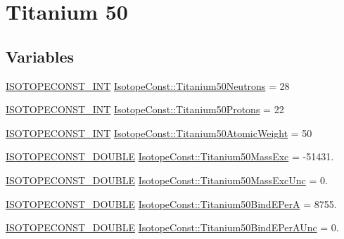 \hypertarget{group___isotope_const-_titanium-_ti50}{}\section{Titanium 50}
\label{group___isotope_const-_titanium-_ti50}
\subsection*{Variables}
\begin{DoxyCompactItemize}
\item 
\mbox{\hyperlink{group___isotope_const-_macros_ga5f18360b3e99483a35c32d789e62621c}{I\+S\+O\+T\+O\+P\+E\+C\+O\+N\+S\+T\+\_\+\+I\+NT}} \mbox{\hyperlink{group___isotope_const-_titanium-_ti50_gaf62e2193f50c55753e1254328da65dd9}{Isotope\+Const\+::\+Titanium50\+Neutrons}} = 28
\item 
\mbox{\hyperlink{group___isotope_const-_macros_ga5f18360b3e99483a35c32d789e62621c}{I\+S\+O\+T\+O\+P\+E\+C\+O\+N\+S\+T\+\_\+\+I\+NT}} \mbox{\hyperlink{group___isotope_const-_titanium-_ti50_ga5084ab4a1070e145d9d53a9663b88e12}{Isotope\+Const\+::\+Titanium50\+Protons}} = 22
\item 
\mbox{\hyperlink{group___isotope_const-_macros_ga5f18360b3e99483a35c32d789e62621c}{I\+S\+O\+T\+O\+P\+E\+C\+O\+N\+S\+T\+\_\+\+I\+NT}} \mbox{\hyperlink{group___isotope_const-_titanium-_ti50_gadd63620f8c7891c59cfa0c38a936ea76}{Isotope\+Const\+::\+Titanium50\+Atomic\+Weight}} = 50
\item 
\mbox{\hyperlink{group___isotope_const-_macros_ga8f45a7272ce02c0b4c65c44636ed719a}{I\+S\+O\+T\+O\+P\+E\+C\+O\+N\+S\+T\+\_\+\+D\+O\+U\+B\+LE}} \mbox{\hyperlink{group___isotope_const-_titanium-_ti50_ga77dd3ad40b842a3dce9cd10012c12e47}{Isotope\+Const\+::\+Titanium50\+Mass\+Exc}} = -\/51431.
\item 
\mbox{\hyperlink{group___isotope_const-_macros_ga8f45a7272ce02c0b4c65c44636ed719a}{I\+S\+O\+T\+O\+P\+E\+C\+O\+N\+S\+T\+\_\+\+D\+O\+U\+B\+LE}} \mbox{\hyperlink{group___isotope_const-_titanium-_ti50_ga963701d96b0242dda1016017ae115ba2}{Isotope\+Const\+::\+Titanium50\+Mass\+Exc\+Unc}} = 0.
\item 
\mbox{\hyperlink{group___isotope_const-_macros_ga8f45a7272ce02c0b4c65c44636ed719a}{I\+S\+O\+T\+O\+P\+E\+C\+O\+N\+S\+T\+\_\+\+D\+O\+U\+B\+LE}} \mbox{\hyperlink{group___isotope_const-_titanium-_ti50_ga6d8f3102589cbb55084c37d623fc91e5}{Isotope\+Const\+::\+Titanium50\+Bind\+E\+PerA}} = 8755.
\item 
\mbox{\hyperlink{group___isotope_const-_macros_ga8f45a7272ce02c0b4c65c44636ed719a}{I\+S\+O\+T\+O\+P\+E\+C\+O\+N\+S\+T\+\_\+\+D\+O\+U\+B\+LE}} \mbox{\hyperlink{group___isotope_const-_titanium-_ti50_ga466cc590b383e6374a26f2009abc42b9}{Isotope\+Const\+::\+Titanium50\+Bind\+E\+Per\+A\+Unc}} = 0.

\end{DoxyCompactItemize}
